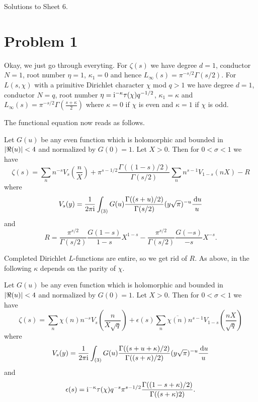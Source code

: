 \documentclass[a4paper,11pt]{article}
\author{Max von Consbruch}
\begin{document}
\begin{center}
    \huge{Solutions to Sheet 6.}
\end{center}

\section*{Problem 1}
Okay, we just go through everyting.
For $\zeta(s)$ we have degree $d=1$, conductor $N=1$, root number 
$\eta = 1$, $\kappa_1 = 0$ and hence $L_\infty(s) = \pi^{-s/2}\Gamma(s/2)$. 
For $L(s, \chi)$ with a primitive Dirichlet character $\chi$ mod $q>1$ we have
degree $d=1$, conductor $N=q$, root number $\eta = \mathrm i^{-\kappa} \tau(\chi)q^{-1/2}$,
$\kappa_1 = \kappa$ and $L_\infty(s) = \pi^{-s/2}\Gamma(\frac{s+\kappa}2)$
where $\kappa = 0$ if $\chi$ is even and $\kappa = 1$ if $\chi$ is odd. 

The functional equation now reads as follows.
\begin{thm}
    Let $G(u)$ be any even function which is holomorphic and bounded in 
    $\left\lvert \Re(u) \right\rvert < 4$ and normalized by $G(0) = 1$. Let $X>0$. Then for 
    $0 < \sigma < 1$ we have 
    \[
        \zeta(s) =
        \sum_n n^{-s} V_s \left(\frac nX \right) + 
        \pi^{s-1/2} \frac{\Gamma((1-s)/2)}{\Gamma(s/2)} \sum_n 
        n^{s-1} V_{1-s}(nX) - R
    \]
    where
    \[
        V_s(y) = \frac{1}{2 \pi \mathrm i} \int_{(3)} G(u)  \frac{\Gamma((s+u)/2)}
        {\Gamma(s/2)}(y \sqrt \pi)^{-u} \frac{\mathrm{\,d} u}u
    \]
    and
    \[
        R = \frac{\pi^{s/2}}{\Gamma(s/2)} \frac{G(1-s)}{1-s} X^{1-s}
        - \frac{\pi^{s/2}}{\Gamma(s/2)} \frac{G(-s)}{-s} X^{-s}.
    \]
\end{thm}
Completed Dirichlet $L$-functions are entire, so we get rid of $R$. 
As above, in the following $\kappa$ depends on the parity of $\chi$. 
\begin{thm}
Let $G(u)$ be any even function which is holomorphic and bounded in 
    $\left\lvert \Re(u) \right\rvert < 4$ and normalized by $G(0) = 1$. Let $X>0$. Then for 
    $0 < \sigma < 1$ we have 
    \[
        \zeta(s) =
        \sum_n \chi(n)n^{-s} V_s \left(\frac n{X\sqrt q} \right) + 
        \epsilon(s) \sum_n \overline{\chi(n)}
        n^{s-1} V_{1-s}\left(\frac{nX}{\sqrt q}\right)
    \]
    where
    \[
        V_s(y) = \frac{1}{2 \pi \mathrm i} \int_{(3)} G(u) 
        \frac{\Gamma((s+u+\kappa)/2)}
        {\Gamma((s+\kappa)/2)} (y \sqrt \pi)^{-u} \frac{\mathrm{\,d} u}u
    \]
    and
    \[
        \epsilon(s) = \mathrm i^{-\kappa} \tau(\chi) q^{-s} \pi^{s-1/2} \frac{\Gamma
        ((1-s+\kappa)/2)} {\Gamma((s+\kappa)2)}.
    \]
\end{thm}
\end{document}
